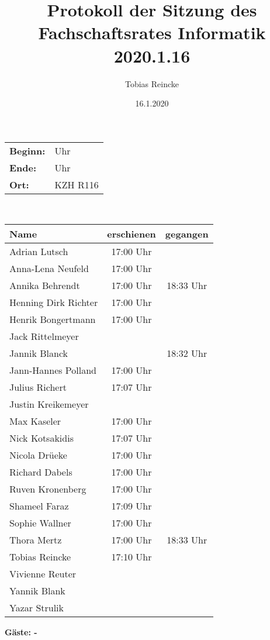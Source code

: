 \documentclass[]{article}
\title{Protokoll der Sitzung des Fachschaftsrates Informatik 2020.1.16}
\author{Tobias Reincke}
\date{16.1.2020}
\begin{document}
\maketitle
\tableofcontents

\setlength{\parindent}{0pt} 

\addtolength{\textwidth}{1.0in}
\addtolength{\textheight}{1.00in}
\addtolength{\evensidemargin}{-0.75in}
\addtolength{\oddsidemargin}{-0.75in}
\addtolength{\topmargin}{-.50in}

\section{}
\begin{tabular}{l l}
	\textbf{Beginn:} &  Uhr\\
	\textbf{Ende:} & Uhr\\
	\textbf{Ort:} & KZH R116\\
\end{tabular}\\
\begin{table}[h]
	\centering
	\begin{tabular}{|l|c|c|}
		\hline
		Name & erschienen & gegangen \\
		\hline
		Adrian Lutsch        & 17:00 Uhr &  \\
		Anna-Lena Neufeld    & 17:00 Uhr & \\
		Annika Behrendt      & 17:00 Uhr & 18:33 Uhr \\
		Henning Dirk Richter &17:00 Uhr & \\
		Henrik Bongertmann   & 17:00 Uhr & \\
		Jack Rittelmeyer     & & \\
		Jannik Blanck &  & 18:32 Uhr\\
		Jann-Hannes Polland  & 17:00 Uhr &  \\
		
		
		Julius Richert       & 17:07 Uhr & \\
		Justin Kreikemeyer   & & \\
		Max Kaseler          & 17:00 Uhr & \\
		Nick Kotsakidis      & 17:07 Uhr & \\
		Nicola Drüeke        & 17:00 Uhr & \\
		Richard Dabels       & 17:00 Uhr & \\
		Ruven Kronenberg     & 17:00 Uhr & \\
		Shameel Faraz        & 17:09 Uhr & \\
		Sophie Wallner       & 17:00 Uhr & \\
		Thora Mertz          & 17:00 Uhr & 18:33 Uhr \\
		Tobias Reincke       & 17:10 Uhr & \\
		Vivienne Reuter      & & \\
		Yannik Blank         & & \\
		Yazar Strulik        & & \\
		\hline
	\end{tabular}
\end{table}
\textbf{Gäste: -}
\end{document}

